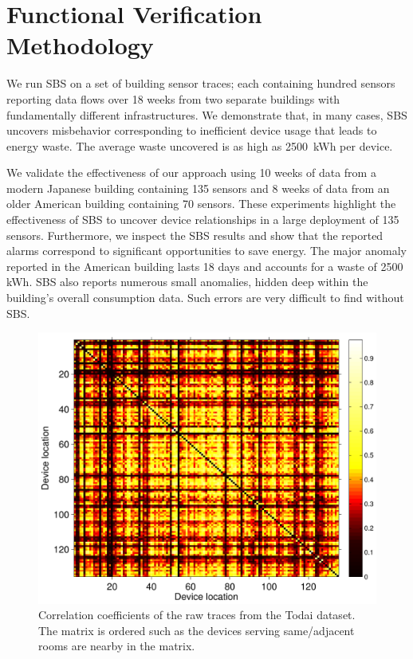 \section{Functional Verification Methodology}
\label{sec:sbsmethod}
We run SBS on a set of building sensor traces; each containing hundred sensors reporting data flows over 18 weeks from two separate buildings with fundamentally different infrastructures.  
We demonstrate that, in many cases, SBS uncovers misbehavior corresponding to inefficient device usage that leads to energy waste.  
The average waste uncovered is as high as 2500~kWh per device. 

We validate the effectiveness of our approach using 10 weeks of data from a modern Japanese building containing 135 sensors and 
8 weeks of data from an older American building containing 70 sensors.
These experiments highlight the effectiveness of SBS to uncover device relationships in a large deployment of 135 sensors.
Furthermore, we inspect the SBS results and show that the reported alarms correspond to significant opportunities to save energy.
The major anomaly reported in the American building lasts 18 days and accounts for a waste of 2500 kWh. %
SBS also reports numerous small anomalies, hidden deep within the building's overall consumption data.  Such errors are very difficult to find
without SBS.

\begin{figure}
\begin{center}
\includegraphics[width=.5\textwidth]{figs/heatMap_raw_201106-eps-converted-to.pdf}
\caption{Correlation coefficients of the raw traces from the Todai dataset.
The matrix is ordered such as the devices serving same/adjacent rooms are nearby in the matrix.}
\label{fig:heatmap:raw}
\end{center}
\end{figure}

